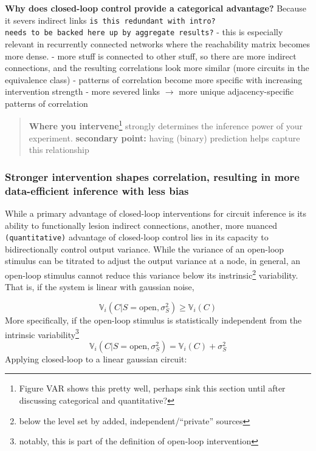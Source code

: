 \textbf{Why does closed-loop control provide a categorical advantage?}
Because it severs indirect links
\texttt{is\ this\ redundant\ with\ intro?}
\texttt{needs\ to\ be\ backed\ here\ up\ by\ aggregate\ results?} - this
is especially relevant in recurrently connected networks where the
reachability matrix becomes more dense. - more stuff is connected to
other stuff, so there are more indirect connections, and the resulting
correlations look more similar (more circuits in the equivalence class)
- patterns of correlation become more specific with increasing
intervention strength - more severed links \(\rightarrow \) more unique
adjacency-specific patterns of correlation

\begin{quote}
\textbf{Where you intervene}\footnote{Figure VAR shows this pretty well,
  perhaps sink this section until after discussing categorical and
  quantitative?} strongly determines the inference power of your
experiment. \textbf{secondary point:} having (binary) prediction helps
capture this relationship
\end{quote}

\hypertarget{stronger-intervention-shapes-correlation-resulting-in-more-data-efficient-inference-with-less-bias}{%
\subsubsection{Stronger intervention shapes correlation, resulting in
more data-efficient inference with less
bias}\label{stronger-intervention-shapes-correlation-resulting-in-more-data-efficient-inference-with-less-bias}}

While a primary advantage of closed-loop interventions for circuit
inference is its ability to functionally lesion indirect connections,
another, more nuanced \texttt{(quantitative)} advantage of closed-loop
control lies in its capacity to bidirectionally control output variance.
While the variance of an open-loop stimulus can be titrated to adjust
the output variance at a node, in general, an open-loop stimulus cannot
reduce this variance below its instrinsic\footnote{below the level set
  by added, independent/``private'' sources} variability. That is, if
the system is linear with gaussian noise,

\[\mathbb{V}_{i}(C|S=\text{open},\sigma^2_S) \geq \mathbb{V}_{i}(C)\]
More specifically, if the open-loop stimulus is statistically
independent from the intrinsic variability\footnote{notably, this is
  part of the definition of open-loop intervention}
\[\mathbb{V}_{i}(C|S=\text{open},\sigma^2_S) = \mathbb{V}_{i}(C) + \sigma^2_S\]
Applying closed-loop to a linear gaussian circuit:

